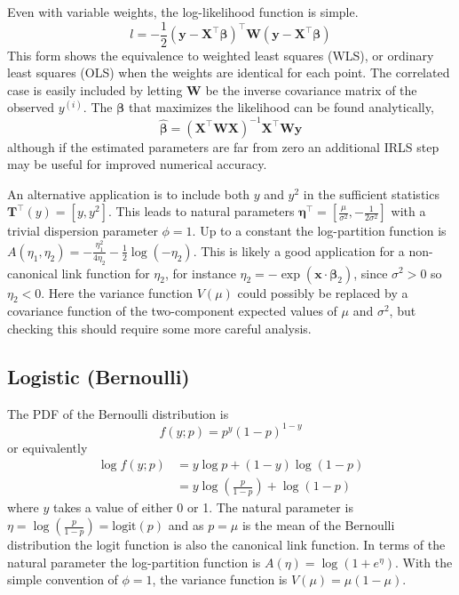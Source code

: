 \documentclass{article}
\newcommand{\bbeta}{\boldsymbol{\beta}}
\begin{document}
Even with variable weights, the log-likelihood function is simple.
\[ l = -\frac{1}{2} (\mathbf{y} - \mathbf{X}^\intercal
\bbeta)^\intercal \mathbf{W} (\mathbf{y} - \mathbf{X}^\intercal
\bbeta) \]
This form shows the equivalence to weighted least squares (WLS), or ordinary
least squares (OLS) when the weights are identical for each point.
The correlated case is easily included by letting \(\mathbf{W}\) be the
inverse covariance matrix of the observed \(y^{(i)}\). The
\(\bbeta\) that maximizes the likelihood can be found
analytically,
\[ \hat{\bbeta} = (\mathbf{X}^\intercal \mathbf{W} \mathbf{X})^{-1}
\mathbf{X}^\intercal \mathbf{W} \mathbf{y} \]
although if the estimated parameters are far from zero an additional IRLS step
may be useful for improved numerical accuracy.

An alternative application is to include both \(y\) and \(y^2\) in the
sufficient statistics \(\mathbf{T}^\intercal(y) = [y, y^2]\). This leads to
natural parameters \(\boldsymbol{\eta}^\intercal = \left[ \frac{\mu}{\sigma^2},
-\frac{1}{2\sigma^2} \right] \) with a trivial dispersion parameter \(\phi =
1\). Up to a constant the log-partition function is \(A(\eta_1, \eta_2) =
-\frac{\eta_1^2}{4\eta_2} - \frac{1}{2}\log (-\eta_2) \). This is likely a good
application for a non-canonical link function for \(\eta_2\), for instance
\(\eta_2 = - \exp(\mathbf{x}\cdot\bbeta_2)\), since \(\sigma^2 >
0\) so \(\eta_2 < 0\). Here the variance function \(V(\mu)\) could possibly
be replaced by a covariance function of the two-component expected values of
\(\mu\) and \(\sigma^2\), but checking this should require some more careful
analysis. 


\subsection{Logistic (Bernoulli)}

The PDF of the Bernoulli distribution is
\[ f(y; p) = p^y (1-p)^{1-y} \]
or equivalently
\begin{align}
\log f(y; p) &= y \log p + (1-y) \log(1-p) \\\
&= y \log\left(\frac{p}{1-p}\right) + \log(1-p)
\end{align}
where \(y\) takes a value of either 0 or 1.
The natural parameter is \(\eta = \log\left(\frac{p}{1-p}\right) =
\textrm{logit}(p) \) and as \(p = \mu\) is the mean of the Bernoulli
distribution the logit function is also the canonical link function.
In terms of the natural parameter the log-partition function is \(A(\eta) =
\log\left(1 + e^\eta \right)\).
With the simple convention of \(\phi=1\), the variance function is \(V(\mu) =
\mu(1-\mu)\).
\end{document}
